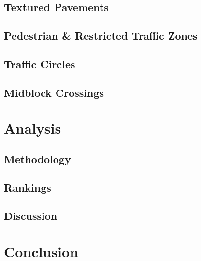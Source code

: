 \documentclass[titlepage,oneside]{article}
\begin{document}
	\subsection{Textured Pavements}
	
	\clearpage
	
	\subsection{Pedestrian \& Restricted Traffic Zones}
	
	\clearpage
	
	\subsection{Traffic Circles}
	
	\clearpage

	\subsection{Midblock Crossings}
	
	\clearpage

\section{Analysis}

	\subsection{Methodology}
	
	\clearpage
	
	\subsection{Rankings}
	
	\clearpage
	
	\subsection{Discussion}
	
	\clearpage

\section{Conclusion}

\clearpage

\nocite{*}
{}

\clearpage





\end{document}
